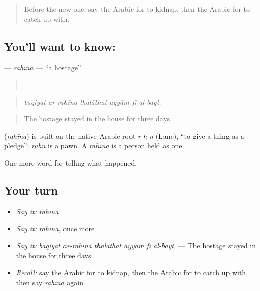 \label{lesson:AR-C347-rahina}



\begin{quote}
Before the new one: say the Arabic for to kidnap, then the Arabic for to catch up with.
\end{quote}

\subsection*{You'll want to know: }
\textbf{} — \emph{rahīna} — \textquotedblleft{}a hostage\textquotedblright{}.

\begin{quote}
     .
\end{quote}

\begin{quote}
\emph{baqiyat ar-rahīna thalāthat ayyām fī al-bayt.}
\end{quote}

\begin{quote}
The hostage stayed in the house for three days.
\end{quote}

\begin{cousinweb}
\textbf{} (\emph{rahīna}) is built on the native Arabic root \emph{r-h-n} (Lane), \textquotedblleft{}to give a thing as a pledge\textquotedblright{}; \emph{rahn} is a pawn. A \emph{rahīna} is a person held as one.
\end{cousinweb}

\begin{grammarlens}[title={What you've built}]
One more word for telling what happened.
\end{grammarlens}

\subsection*{Your turn}
\begin{itemize}
\raggedright
  \item \emph{Say it:} \emph{rahīna}
  \item \emph{Say it:} \emph{rahīna}, once more
  \item \emph{Say it:} \emph{baqiyat ar-rahīna thalāthat ayyām fī al-bayt.} — The hostage stayed in the house for three days.
  \item \emph{Recall:} say the Arabic for to kidnap, then the Arabic for to catch up with, then say \emph{rahīna} again
\end{itemize}

